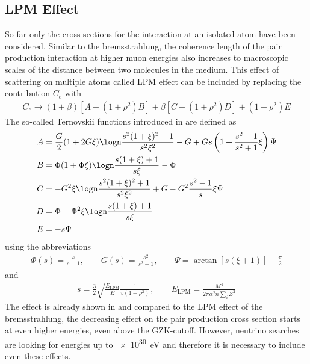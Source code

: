 \subsection{LPM Effect}

So far only the cross-sections for the interaction at an isolated atom have been considered.
Similar to the bremsstrahlung, the coherence length of the pair production interaction at higher muon energies also increases to macroscopic scales of the distance between two molecules in the medium.
This effect of scattering on multiple atoms called LPM effect can be included by replacing the contribution $C_e$ with \cite{Polityko02}
\begin{align}
    C_e \to (1 + \beta)[A + (1 + \rho^2)B] + \beta[C + (1 + \rho^2)D] + (1 - \rho^2)E
\end{align}
The so-called Ternovskii functions introduced in \cite{Ternovskii60} are defined as
\begin{subequations}
\begin{align}
    A &= \frac{G}{2} (1 + 2 G \xi) \logn \frac{s^2 (1 + \xi)^2 + 1}{s^2 \xi^2}
        - G
        + G s \left( 1 + \frac{s^2 - 1}{s^2 + 1} \xi \right) \Psi
    \\
    B &= \Phi(1 + \Phi \xi) \logn \frac{s(1 + \xi) + 1}{s \xi} - \Phi
    \\
    C &= -G^2 \xi \logn \frac{s^2 (1 + \xi)^2 + 1}{s^2 \xi^2}
        + G
        - G^2 \frac{s^2 - 1}{s} \xi \Psi
    \\
    D &= \Phi - \Phi^2 \xi \logn \frac{s(1 + \xi) + 1}{s \xi}
    \\
    E &= -s \Psi
\end{align}
\end{subequations}
using the abbreviations
\begin{align}
    \Phi(s) = \frac{s}{s + 1} ,
    \qquad
    G(s) = \frac{s^2}{s^2 + 1} ,
    \qquad
    \Psi = \arctan[ s (\xi + 1)] - \frac{\pi}{2}
\end{align}
and
\begin{align}
    s = \frac32 \sqrt{\frac{E_{\text{LPM}}}{E} \frac{1}{v(1 - \rho^2)}} ,
    \qquad
    E_{\text{LPM}} = \frac{M^4}{2\pi\alpha^2 n \sum_{i}Z^2}
\end{align}
The effect is already shown in  and compared to the LPM effect of the bremsstrahlung, the decreasing effect on the pair production cross section starts at even higher energies, even above the GZK-cutoff.
However, neutrino searches are looking for energies up to \SI{e30}{eV} and therefore it is necessary to include even these effects.


